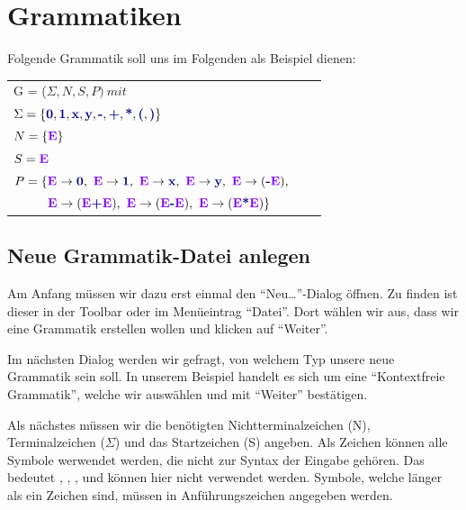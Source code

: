 

\chapter{Grammatiken}\label{Grammar}

Folgende Grammatik soll uns im Folgenden als Beispiel dienen:
\vspace{10pt}

\begin{tabular}{lcr}
G = ($\Sigma, N, S, P )\ mit $\\
$\Sigma = \{\TerminalSymbol{0}, \TerminalSymbol{1}, \TerminalSymbol{x},
\TerminalSymbol{y}, \TerminalSymbol{-}, \TerminalSymbol{+},
\TerminalSymbol{*}, \TerminalSymbol{(}, \TerminalSymbol{)}\}$\\ $N =
\{\StartSymbol{E}\}$\\ $S=\StartSymbol{E}$\\
$P = \{\StartSymbol{E} \to \TerminalSymbol{0},\ \StartSymbol{E} \to \TerminalSymbol{1},\
\StartSymbol{E}	\to \TerminalSymbol{x},\ \StartSymbol{E} \to \TerminalSymbol{y},\
\StartSymbol{E} \to (\TerminalSymbol{-}\StartSymbol{E}),$\\
$\ \ \ \ \ \ \ \ \StartSymbol{E} \to (\StartSymbol{E} \TerminalSymbol{+}
\StartSymbol{E}),\ \StartSymbol{E} \to (\StartSymbol{E} \TerminalSymbol{-} \StartSymbol{E}),\
\StartSymbol{E} \to (\StartSymbol{E} \TerminalSymbol{*} \StartSymbol{E})\}$\\
\end{tabular}

\section{Neue Grammatik-Datei anlegen}

Am Anfang müssen wir dazu erst einmal den "`Neu\ldots"'-Dialog öffnen. Zu finden
ist dieser in der Toolbar oder im Menüeintrag "`Datei"'. Dort wählen wir aus,
dass wir eine Grammatik erstellen wollen und klicken auf "`Weiter"'.\vspace{10pt}

Im nächsten Dialog werden wir gefragt, von welchem Typ unsere neue Grammatik
sein soll. In unserem Beispiel handelt es sich um eine "`Kontextfreie
Grammatik"', welche wir auswählen und mit "`Weiter"' bestätigen.\vspace{10pt}

Als nächstes müssen wir die benötigten Nichtterminalzeichen (N),
Terminalzeichen ($\Sigma$) und das Startzeichen (S) angeben.  Als Zeichen
können alle Symbole werwendet werden, die nicht zur Syntax der Eingabe gehören.
Das bedeutet \Symbol{,}, \Symbol{\{}, \Symbol{\}}, \Symbol{$\vert$} und \SymbolEmpty{}
können hier nicht verwendet werden. Symbole, welche länger als ein Zeichen sind,
müssen in Anführungszeichen angegeben werden.\vspace{10pt}

